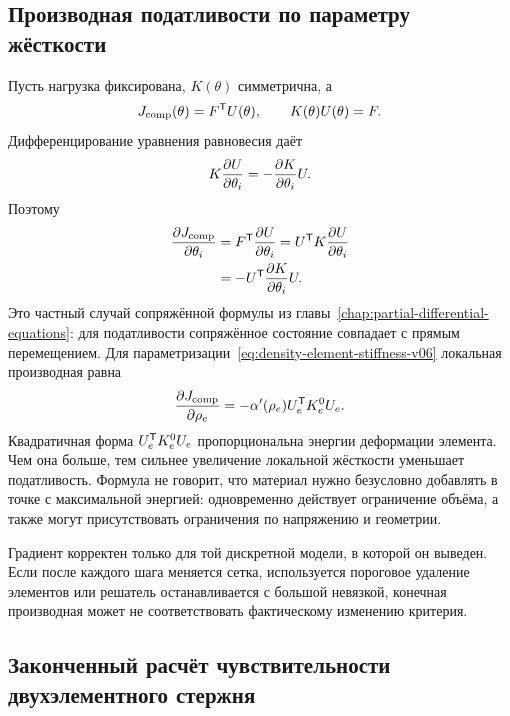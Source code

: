\subsection{Производная податливости по параметру жёсткости}
Пусть нагрузка фиксирована, $K(\theta)$ симметрична, а
\begin{equation}
\label{eq:compliance-definition-v06}
 J_{\mathrm{comp}}(\theta)=F^{\mathsf{T}}U(\theta),
 \qquad
 K(\theta)U(\theta)=F.
\end{equation}
Дифференцирование уравнения равновесия даёт
\begin{equation}
\label{eq:elastic-state-sensitivity-v06}
 K\frac{\partial U}{\partial \theta_i}
 =-
 \frac{\partial K}{\partial \theta_i}U.
\end{equation}
Поэтому
\begin{align}
 \frac{\partial J_{\mathrm{comp}}}{\partial \theta_i}
 &=F^{\mathsf{T}}\frac{\partial U}{\partial \theta_i}
 =U^{\mathsf{T}}K\frac{\partial U}{\partial \theta_i}
 \notag\\
 &=-U^{\mathsf{T}}\frac{\partial K}{\partial \theta_i}U.
\label{eq:elastic-compliance-gradient-v06}
\end{align}
Это частный случай сопряжённой формулы из главы~\ref{chap:partial-differential-equations}: для податливости сопряжённое состояние совпадает с прямым перемещением.
Для параметризации~\eqref{eq:density-element-stiffness-v06} локальная производная равна
\begin{equation}
\label{eq:element-compliance-gradient-v06}
 \frac{\partial J_{\mathrm{comp}}}{\partial \rho_e}
 =-
 \alpha'(\rho_e)
 U_e^{\mathsf{T}}K_e^0U_e.
\end{equation}
Квадратичная форма $U_e^{\mathsf{T}}K_e^0U_e$ пропорциональна энергии деформации элемента. Чем она больше, тем сильнее увеличение локальной жёсткости уменьшает податливость. Формула не говорит, что материал нужно безусловно добавлять в точке с максимальной энергией: одновременно действует ограничение объёма, а также могут присутствовать ограничения по напряжению и геометрии.

Градиент корректен только для той дискретной модели, в которой он выведен. Если после каждого шага меняется сетка, используется пороговое удаление элементов или решатель останавливается с большой невязкой, конечная производная может не соответствовать фактическому изменению критерия.

\subsection{Законченный расчёт чувствительности двухэлементного стержня}
\label{subsec:worked-compliance-sensitivity-v06}

